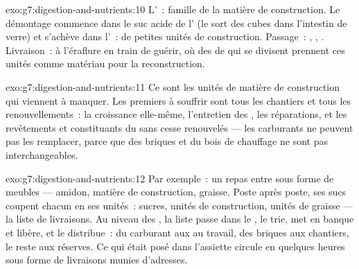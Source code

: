 \begin{solution}{exo:g7:digestion-and-nutrients:10}
L'~: famille de la matière de construction. Le démontage commence
dans le suc acide de l' (le sort des cubes dans l'intestin de
verre) et s'achève dans l'~: de petites unités de
construction. Passage~: , , . Livraison~: à
l'éraflure en train de guérir, où des  de  qui se
divisent prennent ces unités comme matériau pour la reconstruction.
\end{solution}

\begin{solution}{exo:g7:digestion-and-nutrients:11}
Ce sont les unités de matière de construction qui viennent à
manquer. Les premiers à souffrir sont tous les chantiers et tous les
renouvellements~: la croissance elle-même, l'entretien des ,
les réparations, et les revêtements et constituants du  sans
cesse renouvelés --- les  carburants ne peuvent pas les
remplacer, parce que des briques et du bois de chauffage ne sont pas
interchangeables.
\end{solution}

\begin{solution}{exo:g7:digestion-and-nutrients:12}
Par exemple~: un repas entre sous forme de meubles --- amidon,
matière de construction, graisse. Poste après poste, ses sucs
coupent chacun en ses unités~: sucres, unités de construction,
unités de graisse --- la liste de livraisons. Au niveau des
, la liste passe dans le , le  trie, met en banque
et libère, et le  distribue~: du carburant aux  au
travail, des briques aux chantiers, le reste aux réserves. Ce qui
était posé dans l'assiette circule en quelques heures sous forme de
livraisons munies d'adresses.
\end{solution}

